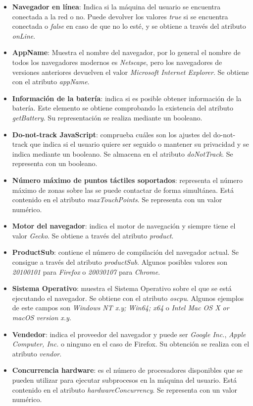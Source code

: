 \begin{itemize}
    \item \textbf{Navegador en línea}: Indica si la máquina del usuario se encuentra conectada a la red o no. Puede devolver los valores \textit{true} si se encuentra conectada o \textit{false} en caso de que no lo esté, y se obtiene a través del atributo \textit{onLine}.
    \item \textbf{AppName}: Muestra el nombre del navegador, por lo general el nombre de todos los navegadores modernos es \textit{Netscape}, pero los navegadores de versiones anteriores devuelven el valor \textit{Microsoft Internet Explorer}. Se obtiene con el atributo \textit{appName}.
    \item \textbf{Información de la batería}: indica si es posible obtener información de la batería. Este elemento se obtiene comprobando la existencia del atributo \textit{getBattery}. Su representación se realiza mediante un booleano.
    \item \textbf{Do-not-track JavaScript}: comprueba cuáles son los ajustes del do-not-track que indica si el usuario quiere ser seguido o mantener su privacidad y se indica mediante un booleano. Se almacena en el atributo \textit{doNotTrack}. Se representa con un booleano.
    \item \textbf{Número máximo de puntos táctiles soportados}: representa el número máximo de zonas sobre las se puede contactar de forma simultánea. Está contenido en el atributo \textit{maxTouchPoints}. Se representa con un valor numérico.
    \item \textbf{Motor del navegador}: indica el motor de navegación y siempre tiene el valor \textit{Gecko}. Se obtiene a través del atributo \textit{product}. 
    \item \textbf{ProductSub}: contiene el número de compilación del navegador actual. Se consigue a través del atributo \textit{productSub}. Algunos posibles valores son \textit{20100101} para \textit{Firefox} o \textit{20030107} para \textit{Chrome}.
    \item \textbf{Sistema Operativo}: muestra el Sistema Operativo sobre el que se está ejecutando el navegador. Se obtiene con el atributo \textit{oscpu}. Algunos ejemplos de este campos son \textit{Windows NT x.y; Win64; x64} o \textit{Intel Mac OS X or macOS version x.y}.
    \item \textbf{Vendedor}: indica el proveedor del navegador y puede ser \textit{Google Inc.}, \textit{Apple Computer, Inc.} o ninguno en el caso de Firefox. Su obtención se realiza con el atributo \textit{vendor}.
    \item \textbf{Concurrencia hardware}: es el número de procesadores disponibles que se pueden utilizar para ejecutar subprocesos en la máquina del usuario. Está contenido en el atributo \textit{hardwareConcurrency}. Se representa con un valor numérico.

\end{itemize}
